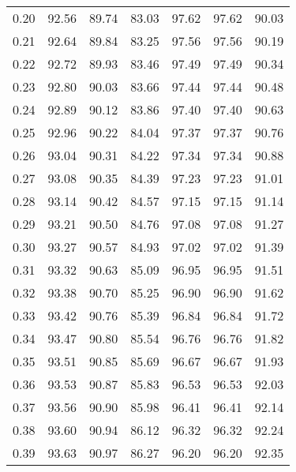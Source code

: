 \begin{tabular}{|c|c|c|c|c|c|c|}
      0.20 &     92.56 &     89.74 &      83.03 &   97.62 &      97.62 &         90.03 \\
      0.21 &     92.64 &     89.84 &      83.25 &   97.56 &      97.56 &         90.19 \\
      0.22 &     92.72 &     89.93 &      83.46 &   97.49 &      97.49 &         90.34 \\
      0.23 &     92.80 &     90.03 &      83.66 &   97.44 &      97.44 &         90.48 \\
      0.24 &     92.89 &     90.12 &      83.86 &   97.40 &      97.40 &         90.63 \\
      0.25 &     92.96 &     90.22 &      84.04 &   97.37 &      97.37 &         90.76 \\
      0.26 &     93.04 &     90.31 &      84.22 &   97.34 &      97.34 &         90.88 \\
      0.27 &     93.08 &     90.35 &      84.39 &   97.23 &      97.23 &         91.01 \\
      0.28 &     93.14 &     90.42 &      84.57 &   97.15 &      97.15 &         91.14 \\
      0.29 &     93.21 &     90.50 &      84.76 &   97.08 &      97.08 &         91.27 \\
      0.30 &     93.27 &     90.57 &      84.93 &   97.02 &      97.02 &         91.39 \\
      0.31 &     93.32 &     90.63 &      85.09 &   96.95 &      96.95 &         91.51 \\
      0.32 &     93.38 &     90.70 &      85.25 &   96.90 &      96.90 &         91.62 \\
      0.33 &     93.42 &     90.76 &      85.39 &   96.84 &      96.84 &         91.72 \\
      0.34 &     93.47 &     90.80 &      85.54 &   96.76 &      96.76 &         91.82 \\
      0.35 &     93.51 &     90.85 &      85.69 &   96.67 &      96.67 &         91.93 \\
      0.36 &     93.53 &     90.87 &      85.83 &   96.53 &      96.53 &         92.03 \\
      0.37 &     93.56 &     90.90 &      85.98 &   96.41 &      96.41 &         92.14 \\
      0.38 &     93.60 &     90.94 &      86.12 &   96.32 &      96.32 &         92.24 \\
      0.39 &     93.63 &     90.97 &      86.27 &   96.20 &      96.20 &         92.35 \\

\end{tabular}
